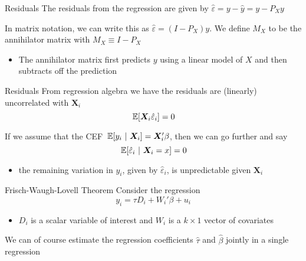 \documentclass[aspectratio=169,t,11pt,table]{beamer}
\begin{document}
\begin{frame}{Residuals}
  The residuals from the regression are given by $\hat{\varepsilon} = y - \hat{y} = y - P_X y$

  \bigskip
  In matrix notation, we can write this as $\hat{\varepsilon} = (I - P_X) y$. We define $M_X$ to be the \alert{annihilator matrix} with $M_X \equiv I - P_X$

  \pause
  \begin{itemize}
    \item The annihilator matrix first predicts $y$ using a linear model of $X$ and then subtracts off the prediction
  \end{itemize}
\end{frame}

\begin{frame}{Residuals}
  From regression algebra we have the residuals are (linearly) uncorrelated with $\bm{X}_i$ 
  $$
    \expec{\bm{X}_i \hat{\varepsilon}_i} = 0
  $$
  
  \bigskip
  \pause 
  If we assume that the CEF $\expec{y_i}{\bm{X}_i} = \bm{X}_i' \beta$, then we can go further and say 
  $$
    \expec{\hat{\varepsilon}_i}{\bm{X}_i = x} = 0
  $$
  \begin{itemize}
    \item the remaining variation in $y_i$, given by $\hat{\varepsilon}_i$, is unpredictable given $\bm{X}_i$
  \end{itemize}
\end{frame}


\begin{frame}{Frisch-Waugh-Lovell Theorem}
  Consider the regression
  $$
    y_i = \tau D_i + W_i' \beta + u_i
  $$
  \begin{itemize}
    \item $D_i$ is a scalar variable of interest and $W_i$ is a $k \times 1$ vector of covariates
  \end{itemize}

  \bigskip
  We can of course estimate the regression coefficients $\hat{\tau}$ and $\hat{\beta}$ jointly in a single regression
\end{frame}
\end{document}
